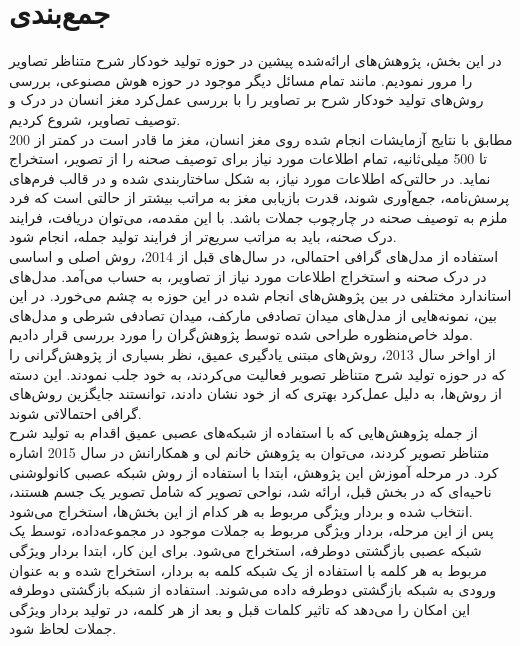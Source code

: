 

\section{جمع‌بندی}
در این بخش، پژوهش‌های ارائه‌شده پیشین در حوزه تولید خودکار شرح متناظر تصاویر را مرور نمودیم. مانند تمام مسائل دیگر موجود در حوزه هوش مصنوعی، بررسی روش‌های تولید خودکار شرح بر تصاویر را با بررسی عمل‌کرد مغز انسان در درک و توصیف تصاویر،‌ شروع کردیم. 
\\
مطابق‌ با نتایج آزمایشات انجام شده روی مغز انسان، مغز ما قادر است در کمتر از 200 تا 500 میلی‌ثانیه، تمام اطلاعات مورد نیاز برای توصیف صحنه را از تصویر، استخراج نماید. در حالتی‌که اطلاعات مورد نیاز، به شکل ساختاربندی شده و در قالب فرم‌های پرسش‌نامه، جمع‌آوری شوند، قدرت بازیابی مغز به مراتب بیشتر از حالتی است که فرد ملزم به توصیف صحنه در چارچوب جملات باشد. با این مقدمه، می‌توان دریافت، فرایند درک صحنه، باید به مراتب سریع‌تر از فرایند تولید جمله، انجام شود.
\\
استفاده از مدل‌های گرافی احتمالی، در سال‌های قبل از 2014، روش اصلی و اساسی در درک صحنه و استخراج اطلاعات مورد نیاز از تصاویر، به حساب می‌آمد. مدل‌های استاندارد مختلفی در بین پژوهش‌های انجام شده در این حوزه به چشم می‌خورد. در این بین، نمونه‌هایی از مدل‌های میدان تصادفی مارکف، میدان تصادفی شرطی و مدل‌های مولد خاص‌منظوره طراحی شده توسط پژوهش‌گران را مورد بررسی قرار دادیم.
\\
از اواخر سال 2013، روش‌های مبتنی یادگیری عمیق، نظر بسیاری از پژوهش‌گرانی را که در حوزه تولید شرح متناظر تصویر فعالیت می‌کردند، به خود جلب نمودند. این دسته‌ از روش‌ها، به دلیل عمل‌کرد بهتری که از خود نشان دادند، توانستند جایگزین روش‌های گرافی احتمالاتی شوند. 
\\
از جمله پژوهش‌هایی که با استفاده از شبکه‌های عصبی عمیق اقدام به تولید شرح متناظر تصویر کردند، می‌توان به پژوهش خانم لی و همکارانش \cite{karpathy2015deep} در سال 2015  اشاره کرد. در مرحله آموزش این پژوهش، ابتدا با استفاده از روش شبکه عصبی کانولوشنی ناحیه‌ای که در بخش قبل، ارائه شد، نواحی تصویر که شامل تصویر یک جسم هستند، انتخاب شده و بردار ویژگی مربوط به هر کدام از این بخش‌ها، استخراج می‌شود.
\\
پس از این مرحله، بردار ویژگی مربوط به جملات موجود در مجموعه‌داده، توسط یک شبکه عصبی بازگشتی دوطرفه، استخراج می‌شود. برای این‌ کار، ابتدا بردار ویژگی مربوط به هر کلمه با استفاده از یک شبکه کلمه به بردار، استخراج شده و به عنوان ورودی به شبکه بازگشتی دوطرفه داده می‌شوند. استفاده از شبکه بازگشتی دوطرفه این امکان را می‌دهد که تاثیر کلمات قبل و بعد از هر کلمه، در تولید بردار ویژگی جملات لحاظ شود.
